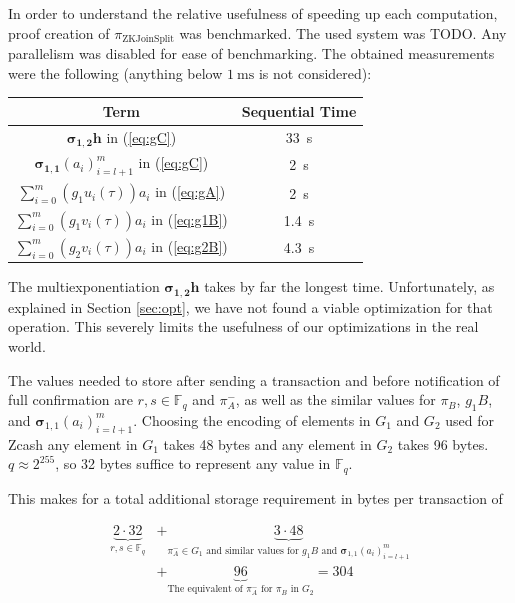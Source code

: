 \documentclass{article}
\begin{document}
In order to understand the relative usefulness of speeding up each computation, proof creation of $\pi_\text{ZKJoinSplit}$ was benchmarked.
The used system was TODO.
Any parallelism was disabled for ease of benchmarking.  %
The obtained measurements were the following (anything below $\SI{1}{\milli\second}$ is not considered):

\begin{center}
\begin{tabular}{ c|c }
        Term & Sequential Time \\
        \hline
        $\boldsymbol{\sigma_{1,2}}\boldsymbol{h}$ in (\ref{eq:gC}) & \SI{33}{\second} \\
        $\boldsymbol{\sigma_{1,1}}(a_i)_{i=l+1}^m$ in (\ref{eq:gC}) & \SI{2}{\second} \\
        $\sum_{i=0}^m(g_1u_i(\tau))a_i$ in (\ref{eq:gA}) & \SI{2}{\second} \\
        $\sum_{i=0}^m(g_1v_i(\tau))a_i$ in (\ref{eq:g1B}) & \SI{1.4}{\second} \\
        $\sum_{i=0}^m(g_2v_i(\tau))a_i$ in (\ref{eq:g2B}) & \SI{4.3}{\second}
\end{tabular}
\end{center}

The multiexponentiation $\boldsymbol{\sigma_{1,2}}\boldsymbol{h}$ takes by far the longest time.
Unfortunately, as explained in Section \ref{sec:opt}, we have not found a viable optimization for that operation.
This severely limits the usefulness of our optimizations in the real world.

The values needed to store after sending a transaction and before notification of full confirmation are $r,s \in \mathbb{F}_q$ and $\pi^-_A$, as well as the similar values for $\pi_B$, $g_1B$, and $\boldsymbol\sigma_{1,1}(a_i)_{i=l+1}^m$.
Choosing the encoding of elements in $G_1$ and $G_2$ used for Zcash \cite{hopwood:zcash} any element in $G_1$ takes 48 bytes and any element in $G_2$ takes 96 bytes.
$q \approx 2^{255}$, so 32 bytes suffice to represent any value in $\mathbb{F}_q$.

This makes for a total additional storage requirement in bytes per transaction of

\begin{align*}
        \underbrace{2\cdot 32}_\text{$r,s \in \mathbb{F}_q$} &+ \underbrace{3\cdot 48}_\text{$\pi^-_A \in G_1$ and similar values for $g_1B$ and $\boldsymbol\sigma_{1,1}(a_i)_{i=l+1}^m$} \\
        &+ \underbrace{96}_\text{The equivalent of $\pi^-_A$ for $\pi_B$ in $G_2$} = 304
\end{align*}
\end{document}
